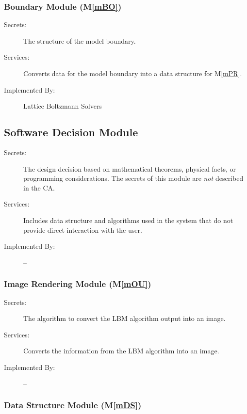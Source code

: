 \documentclass[12pt, titlepage]{article}
\newcommand{\mref}[1]{M\ref{#1}}
\newcommand{\famname}{Lattice Boltzmann Solvers} %
\begin{document}
\subsubsection{Boundary Module (\mref{mBO})}

\begin{description}
	\item[Secrets:]The structure of the model boundary.
	\item[Services:]Converts data for the model boundary into a data structure for \mref{mPR}.
	\item[Implemented By:] \famname
\end{description}



\subsection{Software Decision Module}

\begin{description}
\item[Secrets:] The design decision based on mathematical theorems, physical
  facts, or programming considerations. The secrets of this module are
  \emph{not} described in the CA.
\item[Services:] Includes data structure and algorithms used in the system that
  do not provide direct interaction with the user. 
\item[Implemented By:] --
\end{description}

\subsubsection{Image Rendering Module (\mref{mOU})}

\begin{description}
	\item[Secrets:] The algorithm to convert the LBM algorithm output into an image.
	\item[Services:] Converts the information from the LBM algorithm into an image.
	\item[Implemented By:] --
\end{description}

\subsubsection{Data Structure Module (\mref{mDS})}
\end{document}
